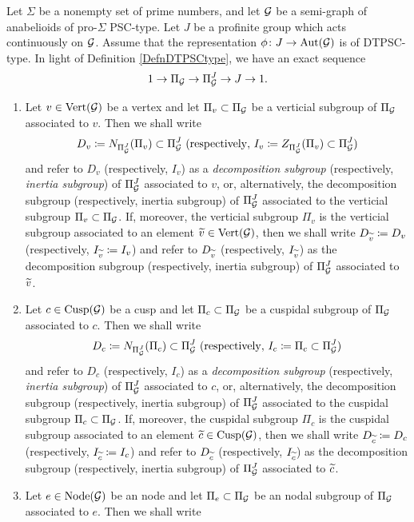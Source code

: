 \begin{defn}\label{DefnDecompositionGroupInertiaGroup}
  Let $\Sigma$ be a nonempty set of prime numbers, and let $\mathcal{G}$ be a semi-graph of anabelioids of pro-$\Sigma$ PSC-type. Let $J$ be a profinite group which acts continuously on $\mathcal{G}$. Assume that the representation $\phi \colon J \to \mathrm{Aut}(\mathcal{G})$ is of DTPSC-type. In light of Definition \ref{DefnDTPSCtype}, we have an exact sequence
  \[
    1 \to \Pi_{\mathcal{G}} \to \Pi_{\mathcal{G}}^J \to J \to 1.
  \]
  \begin{enumerate}
    \item Let $v \in \mathrm{Vert}(\mathcal{G})$ be a vertex and let $\Pi_v \subset \Pi_{\mathcal{G}}$ be a verticial subgroup of $\Pi_{\mathcal{G}}$ associated to $v$. Then we shall write
    \[
      D_v \coloneqq N_{\Pi_{\mathcal{G}}^J}(\Pi_v) \subset \Pi_{\mathcal{G}}^J \ \mathrm{(respectively, \ } I_v \coloneqq Z_{\Pi_{\mathcal{G}}^J}(\Pi_v) \subset \Pi_{\mathcal{G}}^J \mathrm{)}
    \]
    and refer to $D_v$ (respectively, $I_v$) as a \emph{decomposition subgroup} (respectively, \emph{inertia subgroup}) of $\Pi_{\mathcal{G}}^J$ associated to $v$, or, alternatively, the decomposition subgroup (respectively, inertia subgroup) of $\Pi_{\mathcal{G}}^J$ associated to the verticial subgroup $\Pi_v \subset \Pi_{\mathcal{G}}$. If, moreover, the verticial subgroup $\Pi_v$ is the verticial subgroup associated to an element $\widetilde{v} \in \mathrm{Vert}(\mathcal{G})$, then we shall write $D_{\widetilde{v}} \coloneqq D_v$ (respectively, $I_{\widetilde{v}} \coloneqq I_v$) and refer to $D_{\widetilde{v}}$ (respectively, $I_{\widetilde{v}}$) as the decomposition subgroup (respectively, inertia subgroup) of $\Pi_{\mathcal{G}}^J$ associated to $\widetilde{v}$.
    \item Let $c \in \mathrm{Cusp}(\mathcal{G})$ be a cusp and let $\Pi_c \subset \Pi_{\mathcal{G}}$ be a cuspidal subgroup of $\Pi_{\mathcal{G}}$ associated to $c$. Then we shall write
    \[
      D_c \coloneqq N_{\Pi_{\mathcal{G}}^J}(\Pi_c) \subset \Pi_{\mathcal{G}}^J \ \mathrm{(respectively, \ } I_c \coloneqq \Pi_c \subset \Pi_{\mathcal{G}}^J \mathrm{)}
    \]
    and refer to $D_c$ (respectively, $I_c$) as a \emph{decomposition subgroup} (respectively, \emph{inertia subgroup}) of $\Pi_{\mathcal{G}}^J$ associated to $c$, or, alternatively, the decomposition subgroup (respectively, inertia subgroup) of $\Pi_{\mathcal{G}}^J$ associated to the cuspidal subgroup $\Pi_c \subset \Pi_{\mathcal{G}}$. If, moreover, the cuspidal subgroup $\Pi_c$ is the cuspidal subgroup associated to an element $\widetilde{c} \in \mathrm{Cusp}(\mathcal{G})$, then we shall write $D_{\widetilde{c}} \coloneqq D_c$ (respectively, $I_{\widetilde{c}} \coloneqq I_c$) and refer to $D_{\widetilde{c}}$ (respectively, $I_{\widetilde{c}}$) as the decomposition subgroup (respectively, inertia subgroup) of $\Pi_{\mathcal{G}}^J$ associated to $\widetilde{c}$.
    \item Let $e \in \mathrm{Node}(\mathcal{G})$ be an node and let $\Pi_e \subset \Pi_{\mathcal{G}}$ be an nodal subgroup of $\Pi_{\mathcal{G}}$ associated to $e$. Then we shall write

\end{enumerate}
\end{defn}
